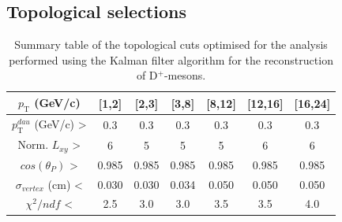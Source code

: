 \documentclass[b5paper,10pt,twoside,oldstyle,classica]{toptesi}
\newcommand{\pt}{p_\text{T}}
\begin{document}
\subsection{Topological selections}
\begin{table}[b]
\centering 
\begin{center} %
\renewcommand\arraystretch{1.4} 
\fontsize{10}{11}\selectfont
\begin{tabular}{|c|c|c|c|c|c|c|}
\hline
$\pt$ (GeV/c) & [1,2] & [2,3] & [3,8] & [8,12] & [12,16] & [16,24]\\
\hline
$\pt^{dau}$ (GeV/c) >& 0.3 & 0.3 & 0.3 & 0.3 & 0.3 & 0.3 \\
Norm. $L_{xy}$ >& 6 & 5 & 5 & 5 & 6 & 6 \\
$cos(\theta_P)$ >& 0.985 & 0.985 & 0.985 & 0.985 & 0.985 & 0.985 \\
$\sigma_{vertex}$ (cm) <& 0.030 & 0.030 & 0.034 & 0.050 & 0.050 & 0.050 \\
$\chi^2/ndf$ <& 2.5 & 3.0 & 3.0 & 3.5 & 3.5 & 4.0 \\
\hline
\end{tabular}
\caption{Summary table of the topological cuts optimised for the analysis performed using the Kalman filter algorithm for the reconstruction of D$^+$-mesons.}
\label{KF_cuts}
\end{center} 
\end{table}
\end{document}
